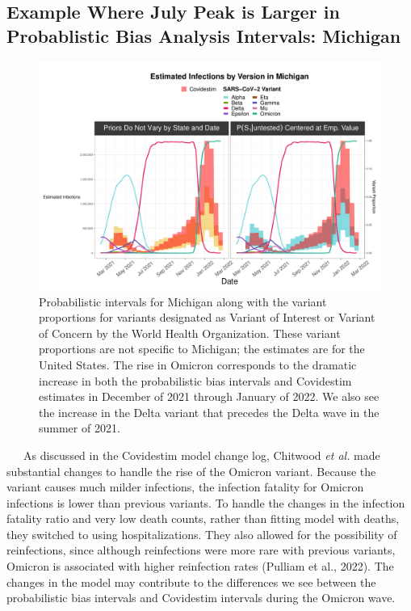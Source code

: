 \documentclass[12pt,twoside]{smiththesis}
\begin{document}
\hypertarget{example-where-july-peak-is-larger-in-probablistic-bias-analysis-intervals-michigan}{%
\subsection{Example Where July Peak is Larger in Probablistic Bias Analysis Intervals: Michigan}\label{example-where-july-peak-is-larger-in-probablistic-bias-analysis-intervals-michigan}}
\begin{figure}
\includegraphics[width=1\linewidth]{figure/michigan_variant} \caption{\label{fig:michigan-variant}Probabilistic intervals for Michigan along with the variant proportions for variants designated as Variant of Interest or Variant of Concern by the World Health Organization. These variant proportions are not specific to Michigan; the estimates are for the United States. The rise in Omicron corresponds to the dramatic increase in both the probabilistic bias intervals and Covidestim estimates in December of 2021 through January of 2022. We also see the increase in the Delta variant that precedes the Delta wave in the summer of 2021.}\label{fig:unnamed-chunk-67}
\end{figure}
~~~As discussed in the Covidestim model change log, Chitwood \emph{et al.} made substantial changes to handle the rise of the Omicron variant. Because the variant causes much milder infections, the infection fatality for Omicron infections is lower than previous variants. To handle the changes in the infection fatality ratio and very low death counts, rather than fitting model with deaths, they switched to using hospitalizations. They also allowed for the possibility of reinfections, since although reinfections were more rare with previous variants, Omicron is associated with higher reinfection rates (Pulliam et al., 2022). The changes in the model may contribute to the differences we see between the probabilistic bias intervals and Covidestim intervals during the Omicron wave.
\end{document}
